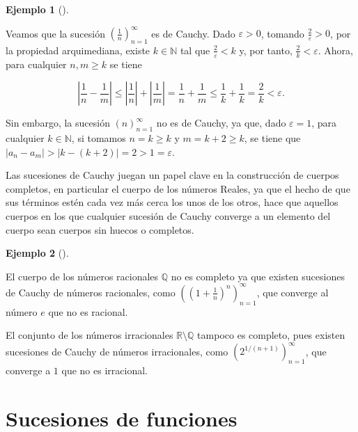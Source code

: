 \documentclass[
  a4paper,
]{scrreport}
\theoremstyle{definition}
\newtheorem{example}{Ejemplo}[chapter]
\theoremstyle{plain}
\theoremstyle{definition}
\theoremstyle{definition}
\theoremstyle{plain}
\theoremstyle{plain}
\theoremstyle{remark}
\begin{document}
\begin{example}[]\protect\hypertarget{exm-sucesion-cauchy}{}\label{exm-sucesion-cauchy}

Veamos que la sucesión \(\left(\frac{1}{n}\right)_{n=1}^\infty\) es de
Cauchy. Dado \(\varepsilon>0\), tomando \(\frac{2}{\varepsilon}>0\), por
la propiedad arquimediana, existe \(k\in\mathbb{N}\) tal que
\(\frac{2}{\varepsilon}<k\) y, por tanto, \(\frac{2}{k}<\varepsilon\).
Ahora, para cualquier \(n,m\geq k\) se tiene

\[
\left|\frac{1}{n}-\frac{1}{m}\right| \leq  \left|\frac{1}{n}\right| +\left|\frac{1}{m}\right| =\frac{1}{n}+\frac{1}{m} \leq \frac{1}{k}+\frac{1}{k}=\frac{2}{k}<\varepsilon.
\]

Sin embargo, la sucesión \((n)_{n=1}^\infty\) no es de Cauchy, ya que,
dado \(\varepsilon=1\), para cualquier \(k\in\mathbb{N}\), si tomamos
\(n=k\geq k\) y \(m=k+2\geq k\), se tiene que
\(|a_n-a_m|>|k-(k+2)|=2>1=\varepsilon\).

\end{example}

Las sucesiones de Cauchy juegan un papel clave en la construcción de
cuerpos completos, en particular el cuerpo de los números Reales, ya que
el hecho de que sus términos estén cada vez más cerca los unos de los
otros, hace que aquellos cuerpos en los que cualquier sucesión de Cauchy
converge a un elemento del cuerpo sean cuerpos sin huecos o completos.

\begin{example}[]\protect\hypertarget{exm-sucesion-cauchb-racionales-irracionales}{}\label{exm-sucesion-cauchb-racionales-irracionales}

El cuerpo de los números racionales \(\mathbb{Q}\) no es completo ya que
existen sucesiones de Cauchy de números racionales, como
\(\left((1+\frac{1}{n})^n\right)_{n=1}^\infty\), que converge al número
\(e\) que no es racional.

El conjunto de los números irracionales
\(\mathbb{R}\setminus\mathbb{Q}\) tampoco es completo, pues existen
sucesiones de Cauchy de números irracionales, como
\((2^{1/(n+1)})_{n=1}^\infty\), que converge a \(1\) que no es
irracional.

\end{example}

\section{Sucesiones de funciones}\label{sucesiones-de-funciones}
\end{document}
